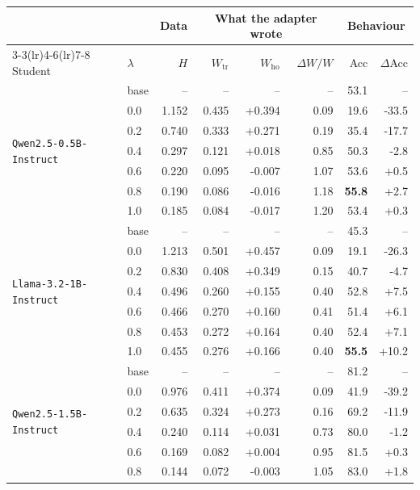 \begin{table}[t]
\centering
\small
\setlength{\tabcolsep}{5pt}
\begin{tabular}{llrrrrrr}
\toprule
& & \multicolumn{1}{c}{Data} & \multicolumn{3}{c}{What the adapter wrote} & \multicolumn{2}{c}{Behaviour} \\
\cmidrule(lr){3-3}\cmidrule(lr){4-6}\cmidrule(lr){7-8}
Student & $\lambda$ & $H$ & $W_{\text{tr}}$ & $W_{\text{ho}}$ & $\Delta W / W$ & Acc & $\Delta$Acc \\
\midrule
\multirow{7}{*}{\texttt{Qwen2.5-0.5B-Instruct}} & base & -- & -- & -- & -- & 53.1 & -- \\
 & 0.0 & 1.152 & 0.435 & +0.394 & 0.09 & 19.6 & -33.5 \\
 & 0.2 & 0.740 & 0.333 & +0.271 & 0.19 & 35.4 & -17.7 \\
 & 0.4 & 0.297 & 0.121 & +0.018 & 0.85 & 50.3 & -2.8 \\
 & 0.6 & 0.220 & 0.095 & -0.007 & \cellcolor{gray!20}1.07 & 53.6 & +0.5 \\
 & 0.8 & 0.190 & 0.086 & -0.016 & \cellcolor{gray!20}1.18 & \textbf{55.8} & +2.7 \\
 & 1.0 & 0.185 & 0.084 & -0.017 & \cellcolor{gray!20}1.20 & 53.4 & +0.3 \\
\midrule
\multirow{7}{*}{\texttt{Llama-3.2-1B-Instruct}} & base & -- & -- & -- & -- & 45.3 & -- \\
 & 0.0 & 1.213 & 0.501 & +0.457 & 0.09 & 19.1 & -26.3 \\
 & 0.2 & 0.830 & 0.408 & +0.349 & 0.15 & 40.7 & -4.7 \\
 & 0.4 & 0.496 & 0.260 & +0.155 & 0.40 & 52.8 & +7.5 \\
 & 0.6 & 0.466 & 0.270 & +0.160 & 0.41 & 51.4 & +6.1 \\
 & 0.8 & 0.453 & 0.272 & +0.164 & 0.40 & 52.4 & +7.1 \\
 & 1.0 & 0.455 & 0.276 & +0.166 & 0.40 & \textbf{55.5} & +10.2 \\
\midrule
\multirow{7}{*}{\texttt{Qwen2.5-1.5B-Instruct}} & base & -- & -- & -- & -- & 81.2 & -- \\
 & 0.0 & 0.976 & 0.411 & +0.374 & 0.09 & 41.9 & -39.2 \\
 & 0.2 & 0.635 & 0.324 & +0.273 & 0.16 & 69.2 & -11.9 \\
 & 0.4 & 0.240 & 0.114 & +0.031 & 0.73 & 80.0 & -1.2 \\
 & 0.6 & 0.169 & 0.082 & +0.004 & 0.95 & 81.5 & +0.3 \\
 & 0.8 & 0.144 & 0.072 & -0.003 & \cellcolor{gray!20}1.05 & 83.0 & +1.8 \\

\end{tabular}
\end{table}
